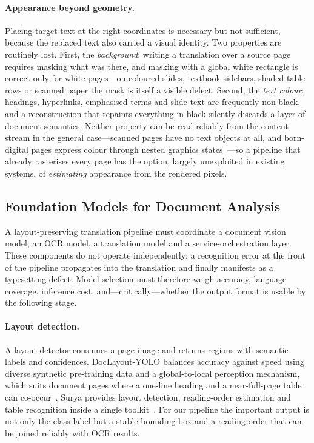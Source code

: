 \paragraph{Appearance beyond geometry.} Placing target text at the right
coordinates is necessary but not sufficient, because the replaced text also
carried a visual identity. Two properties are routinely lost. First, the
\emph{background}: writing a translation over a source page requires masking
what was there, and masking with a global white rectangle is correct only for
white pages---on coloured slides, textbook sidebars, shaded table rows or
scanned paper the mask is itself a visible defect. Second, the \emph{text
colour}: headings, hyperlinks, emphasised terms and slide text are frequently
non-black, and a reconstruction that repaints everything in black silently
discards a layer of document semantics. Neither property can be read reliably
from the content stream in the general case---scanned pages have no text objects
at all, and born-digital pages express colour through nested graphics
states~\citep{pdf-spec}---so a pipeline that already rasterises every page has
the option, largely unexploited in existing systems, of \emph{estimating}
appearance from the rendered pixels.

\subsection{Foundation Models for Document Analysis}
\label{subsec:lit-models}

A layout-preserving translation pipeline must coordinate a document vision
model, an OCR model, a translation model and a service-orchestration layer.
These components do not operate independently: a recognition error at the front
of the pipeline propagates into the translation and finally manifests as a
typesetting defect. Model selection must therefore weigh accuracy, language
coverage, inference cost, and---critically---whether the output format is usable
by the following stage.

\paragraph{Layout detection.} A layout detector consumes a page image and
returns regions with semantic labels and confidences. DocLayout-YOLO balances
accuracy against speed using diverse synthetic pre-training data and a
global-to-local perception mechanism, which suits document pages where a
one-line heading and a near-full-page table can co-occur~\citep{doclayout-yolo}.
Surya provides layout detection, reading-order estimation and table recognition
inside a single toolkit~\citep{surya}. For our pipeline the important output is
not only the class label but a stable bounding box and a reading order that can
be joined reliably with OCR results.

